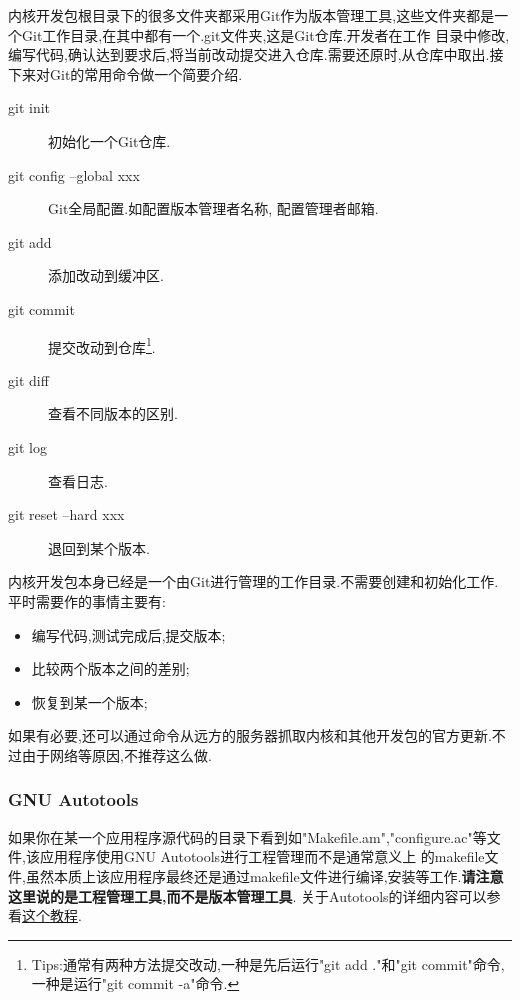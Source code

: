 \documentclass[12pt,a4paper,titlepage]{article}
\begin{document}
内核开发包根目录下的很多文件夹都采用Git作为版本管理工具,这些文件夹都是一个Git工作目录,在其中都有一个.git文件夹,这是Git仓库.开发者在工作
目录中修改,编写代码,确认达到要求后,将当前改动提交进入仓库.需要还原时,从仓库中取出.接下来对Git的常用命令做一个简要介绍.
\begin{description}
\item[git init] 初始化一个Git仓库.
\item[git config --global xxx] Git全局配置.如配置版本管理者名称,
配置管理者邮箱.
\item[git add ] 添加改动到缓冲区.
\item[git commit] 提交改动到仓库\footnote{Tips:通常有两种方法提交改动,一种是先后运行"git add ."和"git commit"命令,
一种是运行"git commit -a"命令.}.
\item[git diff] 查看不同版本的区别.
\item[git log] 查看日志.
\item[git reset --hard xxx] 退回到某个版本.
\end{description}
内核开发包本身已经是一个由Git进行管理的工作目录.不需要创建和初始化工作.平时需要作的事情主要有:
\begin{itemize}
\item 编写代码,测试完成后,提交版本;
\item 比较两个版本之间的差别;
\item 恢复到某一个版本;
\end{itemize}
如果有必要,还可以通过命令从远方的服务器抓取内核和其他开发包的官方更新.不过由于网络等原因,不推荐这么做.
\subsubsection{GNU Autotools}
如果你在某一个应用程序源代码的目录下看到如"Makefile.am","configure.ac"等文件,该应用程序使用GNU Autotools进行工程管理而不是通常意义上
的makefile文件,虽然本质上该应用程序最终还是通过makefile文件进行编译,安装等工作.\textbf{请注意这里说的是工程管理工具,而不是版本管理工具}.
关于Autotools的详细内容可以参看\href{http://www.lrde.epita.fr/~adl/autotools.html}{这个教程}.
\end{document}
